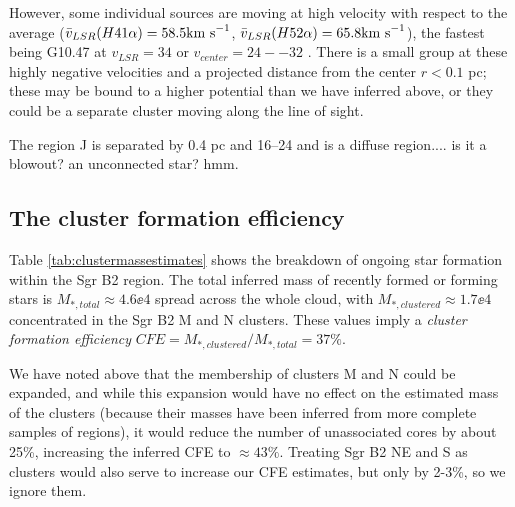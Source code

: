\documentclass[twocolumn]{aastex61}
\begin{document}
However, some individual sources are moving at high velocity with respect to
the average ($\bar{v}_{LSR}(H41\alpha) = 58.5 \textrm{km~s}^{-1}$,
$\bar{v}_{LSR}(H52\alpha) = 65.8 \textrm{km~s}^{-1}$), the fastest being G10.47 at
$v_{LSR}=34$ \kms or $v_{center}=24--32$ \kms.  There is a small group
at these highly negative velocities and a projected distance from the center $r<0.1$ pc;
these may be bound to a higher potential than we have inferred above, or they
could be a separate cluster moving along the line of sight.

The \hii region J is separated by 0.4 pc and 16--24 \kms and is a diffuse \hii region.... is it a blowout?   an unconnected star?  hmm.

\subsection{The cluster formation efficiency}
Table \ref{tab:clustermassestimates} shows the breakdown of ongoing star
formation within the Sgr B2 region.  The total inferred mass of recently
formed or forming stars is $M_{*,total}\approx4.6\ee{4}$ \msun spread across
the whole cloud, with $M_{*,clustered}\approx1.7\ee{4}$ \msun concentrated
in the Sgr B2 M and N clusters.  These values imply a \textit{cluster
formation efficiency} $CFE=M_{*,clustered}/M_{*,total} = 37\%$.

We have noted above that the membership of clusters M and N could be expanded,
and while this expansion would have no effect on the estimated mass of the clusters
(because their masses have been inferred from more complete samples of \hii regions),
it would reduce the number of unassociated cores by about 25\%, increasing the inferred
CFE to $\approx43\%$. %
Treating Sgr B2 NE and S as clusters would also serve to increase our CFE estimates,
but only by 2-3\%, so we ignore them.


\end{document}

